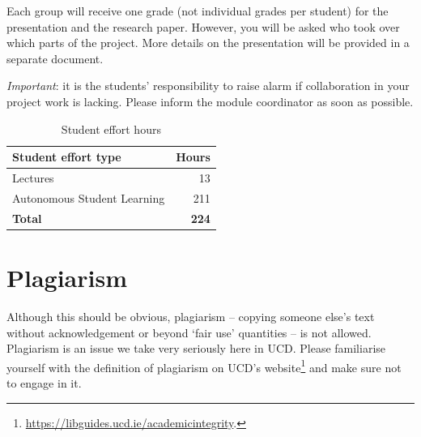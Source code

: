 \documentclass[abstract=on,parskip=full,headings=standardclasses,fontsize=11pt,paper=a4]{scrartcl}
\begin{document}
Each group will receive one grade (not individual grades per student) for the presentation and the research paper. However, you will be asked who took over which parts of the project.  More details on the presentation will be provided in a separate document. 

\textit{Important}: it is the students' responsibility to raise alarm if collaboration in your project work is lacking. Please inform the module coordinator as soon as possible.

\begin{table}[h] \centering \onehalfspacing
\caption*{Student effort hours}
\begin{tabular}{ l r} 
\toprule
Student effort type &  Hours \\
\midrule
Lectures & 13 \\
Autonomous Student Learning  & 211 \\
\textbf{Total} & \textbf{224} \\
\bottomrule
\end{tabular}
\end{table}


\section*{Plagiarism}

Although this should be obvious, plagiarism -- copying someone else's text without acknowledgement or beyond `fair use' quantities -- is not allowed. Plagiarism is an issue we take very seriously here in UCD. Please familiarise yourself with the definition of plagiarism on UCD's website\footnote{\url{https://libguides.ucd.ie/academicintegrity}.} and make sure not to engage in it.
\end{document}
